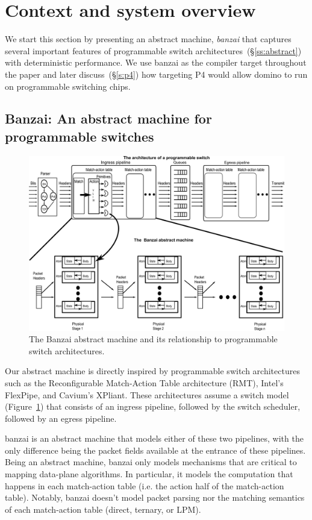 \section{Context and system overview}

We start this section by presenting an abstract machine, \textit{banzai} that
captures several important features of programmable switch
architectures~(\S\ref{ss:abstract}) with deterministic performance. We use
banzai as the compiler target throughout the paper and later
discuss~(\S\ref{s:p4}) how targeting P4 would allow domino to run on
programmable switching chips.

\subsection{Banzai: An abstract machine for programmable switches}
\begin{figure}[!t]
  \includegraphics[width=\textwidth]{banzai.pdf}
  \caption{The Banzai abstract machine and its relationship to programmable switch architectures.}
  \label{fig:switch}
\end{figure}
Our abstract machine is directly inspired by programmable switch architectures
such as the Reconfigurable Match-Action Table architecture (RMT), Intel's
FlexPipe, and Cavium's XPliant. These architectures assume a switch model
(Figure~\ref{fig:switch}) that consists of an ingress pipeline, followed by the
switch scheduler, followed by an egress pipeline.

banzai is an abstract machine that models either of these two pipelines, with
the only difference being the packet fields available at the entrance of these
pipelines. Being an abstract machine, banzai only models mechanisms that are
critical to mapping data-plane algorithms. In particular, it models the
computation that happens in each match-action table (i.e. the action half of
the match-action table). Notably, banzai doesn't model packet parsing nor the
matching semantics of each match-action table (direct, ternary, or LPM).


